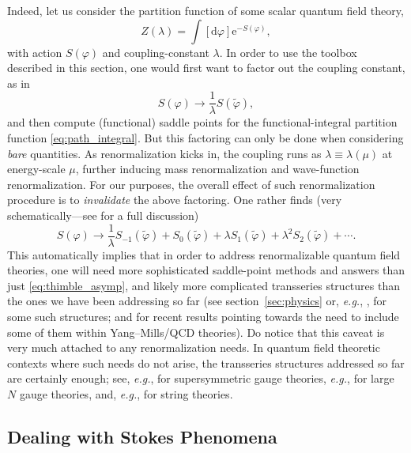 \documentclass[11pt,a4paper]{article}
\newcommand{\be}{\begin{equation}}
\newcommand{\ee}{\end{equation}}
\newcommand{\rme}{{\mathrm{e}}}
\newcommand{\rmd}{{\mathrm{d}}}
\begin{document}
Indeed, let us consider the partition function of some scalar quantum field theory,
%
\be
\label{eq:path_integral}
Z (\lambda) = \int \left[ \rmd \varphi \right] \rme^{- S(\varphi)},
\ee
%
\noindent
with action $S(\varphi)$ and coupling-constant $\lambda$. In order to use the toolbox described in this section, one would first want to factor out the coupling constant, as in
%
\be
S (\varphi) \to \frac{1}{\lambda} S (\widetilde{\varphi} ),
\ee
%
\noindent
and then compute (functional) saddle points for the functional-integral partition function \eqref{eq:path_integral}. But this factoring can only be done when considering \textit{bare} quantities. As renormalization kicks in, the coupling runs as $\lambda \equiv \lambda (\mu)$ at energy-scale $\mu$, further inducing mass renormalization and wave-function renormalization. For our purposes, the overall effect of such renormalization procedure is to \textit{invalidate} the above factoring. One rather finds (very schematically---see \cite{k16} for a full discussion)
%
\be
S (\varphi) \to \frac{1}{\lambda} S_{-1} (\widetilde{\varphi} ) + S_{0} (\widetilde{\varphi} ) + \lambda S_{1} (\widetilde{\varphi} ) + \lambda^2 S_{2} (\widetilde{\varphi} ) + \cdots.
\ee
%
\noindent
This automatically implies that in order to address renormalizable quantum field theories, one will need more sophisticated saddle-point methods and answers than just \eqref{eq:thimble_asymp}, and likely more complicated transseries structures than the ones we have been addressing so far (see section~\ref{sec:physics} or, \textit{e.g.}, \cite{e08}, for some such structures; and \cite{acpy17} for recent results pointing towards the need to include some of them within Yang--Mills/QCD theories). Do notice that this caveat is very much attached to any renormalization needs. In quantum field theoretic contexts where such needs do not arise, the transseries structures addressed so far are certainly enough; see, \textit{e.g.}, \cite{ars14, h16a, h16b, h1710, hy17} for supersymmetric gauge theories, \textit{e.g.}, \cite{msw07, m08, msw08, kmr10, dmp11, asv11, sv13, csv15} for large $N$ gauge theories, and, \textit{e.g.}, \cite{m06, ps09, mpp09, gikm10, cesv13, gmz14, cesv14, c15, cms16, cm16, cms17} for string theories.

\subsection*{Dealing with Stokes Phenomena}
\end{document}
